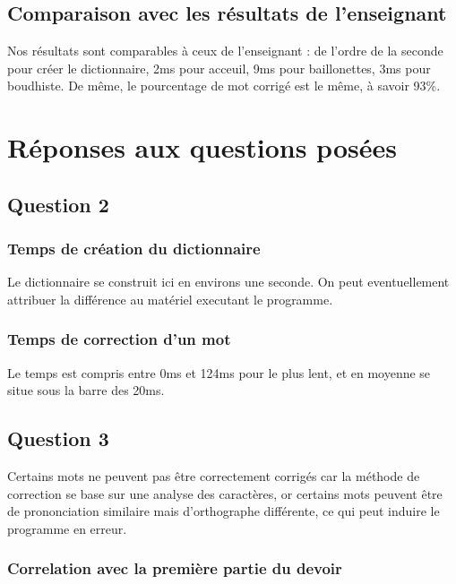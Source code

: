 \documentclass[french,12pt,a4]{report}
\begin{document}
\section{Comparaison avec les résultats de l'enseignant}

Nos résultats sont comparables à ceux de l'enseignant : de l'ordre de
la seconde pour créer le dictionnaire, 2ms pour acceuil, 9ms pour
baillonettes, 3ms pour boudhiste. De même, le pourcentage de mot
corrigé est le même, à savoir 93\%.
 

\chapter{Réponses aux questions posées}

\section{Question 2}



\subsection{Temps de création du dictionnaire}
Le dictionnaire se construit ici en environs une seconde. On peut
eventuellement attribuer la différence au matériel executant le programme.

\subsection{Temps de correction d'un mot}

Le temps est compris entre 0ms et 124ms pour le plus lent, et en
moyenne se situe sous la barre des 20ms.


\section{Question 3}

Certains mots ne peuvent pas être correctement corrigés car la méthode
de correction se base sur une analyse des caractères, or certains mots
peuvent être de prononciation similaire mais d'orthographe différente,
ce qui peut induire le programme en erreur.


\subsection{Correlation avec la première partie du devoir}
\end{document}
